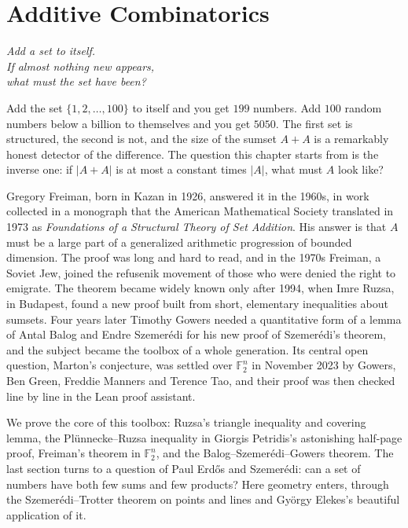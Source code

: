 \chapter{Additive Combinatorics}\label{ch:additive}
\begin{center}\itshape
Add a set to itself.\\
If almost nothing new appears,\\
what must the set have been?
\end{center}

Add the set $\{1,2,\dots,100\}$ to itself and you get $199$ numbers. Add $100$ random numbers below a billion to themselves and you get $5050$. The first set is structured, the second is not, and the size of the sumset $A+A$ is a remarkably honest detector of the difference. The question this chapter starts from is the inverse one: if $|A+A|$ is at most a constant times $|A|$, what must $A$ look like?

Gregory Freiman, born in Kazan in 1926, answered it in the 1960s, in work collected in a monograph that the American Mathematical Society translated in 1973 as \emph{Foundations of a Structural Theory of Set Addition}. His answer is that $A$ must be a large part of a generalized arithmetic progression of bounded dimension. The proof was long and hard to read, and in the 1970s Freiman, a Soviet Jew, joined the refusenik movement of those who were denied the right to emigrate. The theorem became widely known only after 1994, when Imre Ruzsa, in Budapest, found a new proof built from short, elementary inequalities about sumsets. Four years later Timothy Gowers needed a quantitative form of a lemma of Antal Balog and Endre Szemerédi for his new proof of Szemerédi's theorem, and the subject became the toolbox of a whole generation. Its central open question, Marton's conjecture, was settled over $\mathbb F_2^n$ in November 2023 by Gowers, Ben Green, Freddie Manners and Terence Tao, and their proof was then checked line by line in the Lean proof assistant.

We prove the core of this toolbox: Ruzsa's triangle inequality and covering lemma, the Plünnecke--Ruzsa inequality in Giorgis Petridis's astonishing half-page proof, Freiman's theorem in $\mathbb F_2^n$, and the Balog--Szemerédi--Gowers theorem. The last section turns to a question of Paul Erdős and Szemerédi: can a set of numbers have both few sums and few products? Here geometry enters, through the Szemerédi--Trotter theorem on points and lines and György Elekes's beautiful application of it.

